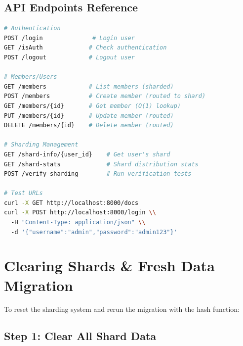 \documentclass[11pt,a4paper]{article}
\begin{document}
\subsection*{API Endpoints Reference}

\begin{lstlisting}[language=bash]
# Authentication
POST /login              # Login user
GET /isAuth             # Check authentication
POST /logout            # Logout user

# Members/Users
GET /members            # List members (sharded)
POST /members           # Create member (routed to shard)
GET /members/{id}       # Get member (O(1) lookup)
PUT /members/{id}       # Update member (routed)
DELETE /members/{id}    # Delete member (routed)

# Sharding Management
GET /shard-info/{user_id}    # Get user's shard
GET /shard-stats             # Shard distribution stats
POST /verify-sharding        # Run verification tests

# Test URLs
curl -X GET http://localhost:8000/docs
curl -X POST http://localhost:8000/login \\
  -H "Content-Type: application/json" \\
  -d '{"username":"admin","password":"admin123"}'
\end{lstlisting}

\section{Clearing Shards \& Fresh Data Migration}

To reset the sharding system and rerun the migration with the hash function:

\subsection*{Step 1: Clear All Shard Data}
\end{document}

